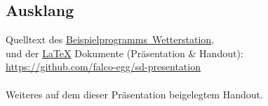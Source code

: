 \documentclass[ngerman]{schoolPres}
\begin{document}
  \subsection{Ausklang}
  \begin{frame}
    \vfill
      {
        \Large
        Quelltext des \textcolor{cyan}{\hyperlink{sec:project}{Beispielprogramms~Wetterstation}},\\
        und der \href{https://www.latex-project.org/}{\LaTeX} Dokumente (Präsentation \& Handout):\\
        \hspace{1em} \url{https://github.com/falco-egg/sd-presentation}\\~\\

        Weiteres auf dem dieser Präsentation beigelegtem Handout.
      }

    \vfill
    {\small \doclicenseText \hfill \doclicenseIcon}
  \end{frame}
\end{document}
